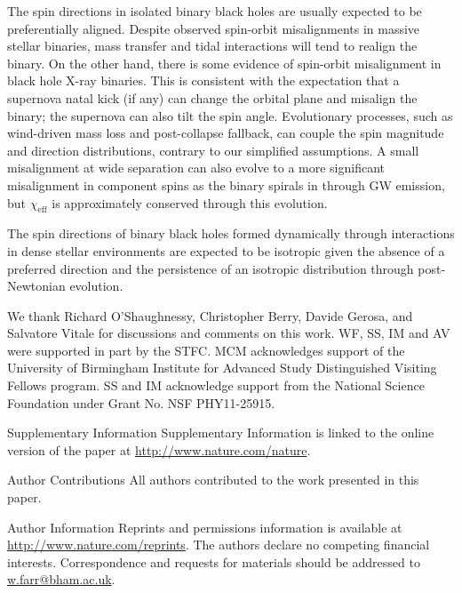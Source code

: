 \documentclass{nature-arxiv}
\newcommand{\chieff}{\chi_\mathrm{eff}}
\begin{document}
The spin directions in isolated binary black
holes\cite{TutukovYungelson:1993,2016Natur.534..512B,Stevenson:2017,MandeldeMink:2016,Marchant:2016}
are usually expected to be preferentially aligned.  Despite observed
spin-orbit misalignments in massive stellar
binaries\cite{Albrecht:2009}, mass transfer and tidal interactions
will tend to realign the binary.  On the other hand, there is some
evidence of spin-orbit misalignment in black hole X-ray
binaries\cite{Martin:2008b,MorningstarMiller:2014}.  This is
consistent with the expectation that a supernova natal kick (if any)
can change the orbital plane and misalign the
binary\cite{2000ApJ...541..319K}; the supernova can also tilt the spin
angle\cite{2011ApJ...742...81F}.  Evolutionary processes, such as
wind-driven mass loss and post-collapse fallback, can couple the spin
magnitude and direction distributions, contrary to our simplified
assumptions.  A small misalignment at wide separation can also evolve
to a more significant misalignment in component spins as the binary
spirals in through \ac{GW} emission\cite{2015PhRvD..92f4016G}, but
$\chieff$ is approximately conserved through this evolution.

The spin directions of binary black holes formed dynamically through
interactions in dense stellar
environments\cite{SigurdssonHernquist:1993,PZMcMillan:2000,Rodriguez:2015,Stone:2016}
are expected to be isotropic given the absence of a preferred
direction\cite{2016ApJ...832L...2R} and the persistence of an
isotropic distribution through post-Newtonian
evolution\cite{2004PhRvD..70l4020S,2007ApJ...661L.147B}.

\begin{addendum}
\item We thank Richard O'Shaughnessy, Christopher Berry, Davide
  Gerosa, and Salvatore Vitale for discussions and comments on this
  work.  WF, SS, IM and AV were supported in part by the STFC.  MCM
  acknowledges support of the University of Birmingham Institute for
  Advanced Study Distinguished Visiting Fellows program.  SS and IM
  acknowledge support from the National Science Foundation under Grant
  No. NSF PHY11-25915.
\item[Supplementary Information] Supplementary Information is linked
  to the online version of the paper at
  \url{http://www.nature.com/nature}.
\item[Author Contributions] All authors contributed to the work
  presented in this paper.
\item[Author Information] Reprints and permissions information is
  available at \url{http://www.nature.com/reprints}.  The authors
  declare no competing financial interests.  Correspondence and
  requests for materials should be addressed to
  \href{mailto:w.farr@bham.ac.uk}{w.farr@bham.ac.uk}.
\end{addendum}
\end{document}

